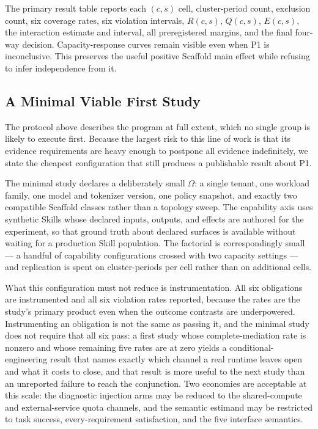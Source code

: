 \documentclass[11pt]{article}
\begin{document}
The primary result table reports each $(c,s)$ cell, cluster-period count, exclusion count, six coverage rates, six violation intervals, $R(c,s)$, $Q(c,s)$, $E(c,s)$, the interaction estimate and interval, all preregistered margins, and the final four-way decision. Capacity-response curves remain visible even when P1 is inconclusive. This preserves the useful positive Scaffold main effect while refusing to infer independence from it.

\subsection{A Minimal Viable First Study}
\label{sec:eval-minimal}

The protocol above describes the program at full extent, which no single group is likely to execute first. Because the largest risk to this line of work is that its evidence requirements are heavy enough to postpone all evidence indefinitely, we state the cheapest configuration that still produces a publishable result about P1.

The minimal study declares a deliberately small $\Omega$: a single tenant, one workload family, one model and tokenizer version, one policy snapshot, and exactly two compatible Scaffold classes rather than a topology sweep. The capability axis uses synthetic Skills whose declared inputs, outputs, and effects are authored for the experiment, so that ground truth about declared surfaces is available without waiting for a production Skill population. The factorial is correspondingly small --- a handful of capability configurations crossed with two capacity settings --- and replication is spent on cluster-periods per cell rather than on additional cells.

What this configuration must not reduce is instrumentation. All six obligations are instrumented and all six violation rates reported, because the rates are the study's primary product even when the outcome contrasts are underpowered. Instrumenting an obligation is not the same as passing it, and the minimal study does not require that all six pass: a first study whose complete-mediation rate is nonzero and whose remaining five rates are at zero yields a conditional-engineering result that names exactly which channel a real runtime leaves open and what it costs to close, and that result is more useful to the next study than an unreported failure to reach the conjunction. Two economies are acceptable at this scale: the diagnostic injection arms may be reduced to the shared-compute and external-service quota channels, and the semantic estimand may be restricted to task success, every-requirement satisfaction, and the five interface semantics.
\end{document}
